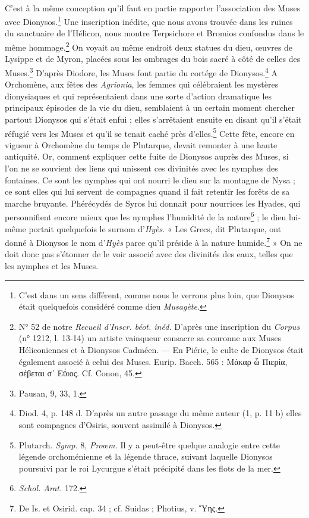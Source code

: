 \documentclass[a4paper, 11pt, oneside, polutonikogreek, french]{article}
\begin{document}
\paragraph{}
C'est à la même conception qu'il faut en partie rapporter l'association des Muses avec Dionysos.\footnote{C'est dans un sens différent, comme nous le verrons plus loin, que Dionysos était quelquefois considéré comme dieu \emph{Musagète}.} Une inscription inédite, que nous avons trouvée dans les ruines du sanctuaire de l'Hélicon, nous montre Terpsichore et Bromios confondus dans le même hommage.\footnote{N° 52 de notre \emph{Recueil d'Inscr. béot. inéd.} D'après une inscription du \emph{Corpus} (n° 1212, l. 13-14) un artiste vainqueur consacre sa couronne aux Muses Héliconiennes et à Dionysos Cadméen. --- En Piérie, le culte de Dionysos était également associé à celui des Muses. Eurip. Bacch. 565 : Μάκαρ ὦ Πιερία, σέβεται σ᾽ Εΰιος. Cf. Conon, 45.} On voyait au même endroit deux statues du dieu, œuvres de Lysippe et de Myron, placées sous les ombrages du bois sacré à côté de celles des Muses.\footnote{Pausan, 9, 33, 1.} D'après Diodore, les Muses font partie du cortége de Dionysos.\footnote{Diod. 4, p. 148 d. D'après un autre passage du même auteur (1, p. 11 b) elles sont compagnes d'Osiris, souvent assimilé à Dionysos.} A Orchomène, aux fêtes des \emph{Agrionia}, les femmes qui célébraient les mystères dionysiaques et qui représentaient dans une sorte d'action dramatique les principaux épisodes de la vie du dieu, semblaient à un certain moment chercher partout Dionysos qui s'était enfui ; elles s'arrêtaient ensuite en disant qu'il s'était réfugié vers les Muses et qu'il se tenait caché près d'elles.\footnote{Plutarch. \emph{Symp.} 8, \emph{Proœm.} Il y a peut-être quelque analogie entre cette légende orchoménienne et la légende thrace, suivant laquelle Dionysos poursuivi par le roi Lycurgue s'était précipité dans les flots de la mer.} Cette fête, encore en vigueur à Orchomène du temps de Plutarque, devait remonter à une haute antiquité. Or, comment expliquer cette fuite de Dionysos auprès des Muses, si l'on ne se souvient des liens qui unissent ces divinités avec les nymphes des fontaines. Ce sont les nymphes qui ont nourri le dieu sur la montagne de Nysa ; ce sont elles qui lui servent de compagnes quand il fait retentir les forêts de sa marche bruyante. Phérécydés de Syros lui donnait pour nourrices les Hyades, qui personnifient encore mieux que les nymphes l'humidité de la nature\footnote{\emph{Schol. Arat.} 172.} ; le dieu lui-même portait quelquefois le surnom d'\emph{Hyès}. « Les Grecs, dit Plutarque, ont donné à Dionysos le nom d'\emph{Hyès} parce qu'il préside à la nature humide.\footnote{De Is. et Osirid. cap. 34 ; cf. Suidas ; Photius, v. Ὕης.} » On ne doit donc pas s'étonner de le voir associé avec des divinités des eaux, telles que les nymphes et les Muses.
\end{document}
